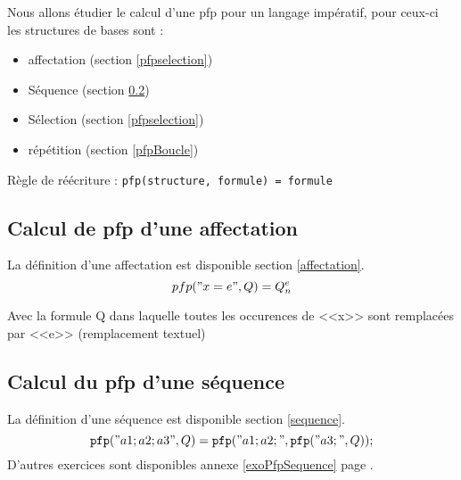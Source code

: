 		Nous allons étudier le calcul d'une pfp pour un langage impératif, pour ceux-ci les structures de bases sont :
			\begin{itemize}
				\item affectation (section \ref{pfpselection})
				\item Séquence (section \ref{pfpsequence})
				\item Sélection (section \ref{pfpselection})
				\item répétition (section \ref{pfpBoucle})
			\end{itemize}

		Règle de réécriture : \texttt{pfp(structure, formule) = formule}

		\subsection{Calcul de pfp d'une affectation}\label{pfpaffectation}
		La définition d'une affectation est disponible section \ref{affectation}.
	$$pfp("x=e", Q) = Q^e_n$$

	Avec la formule Q dans laquelle toutes les occurences de <<x>> sont remplacées par <<e>> (remplacement textuel)
	\subsection{Calcul du pfp d'une séquence}\label{pfpsequence}
		La définition d'une séquence est disponible section \ref{sequence}.
	$$\texttt{pfp}("a1;a2;a3", Q) = \texttt{pfp}("a1;a2;", \texttt{pfp}("a3;", Q));$$
D'autres exercices sont disponibles annexe \ref{exoPfpSequence} page \pageref{exoPfpSequence}.
